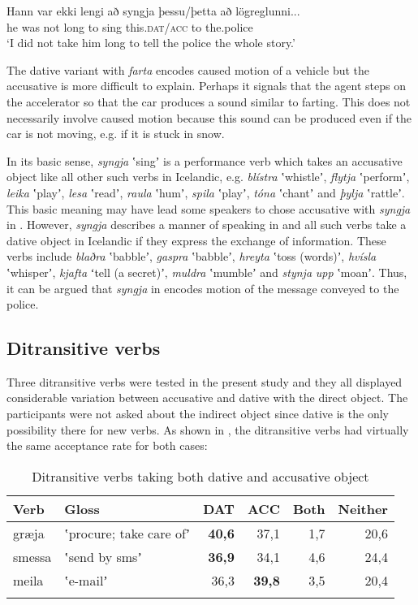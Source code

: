\documentclass[output=paper,modfonts,nonflat,colorlinks,citecolor=brown]{langsci/langscibook}
\begin{document}
\ex  \label{ex:jonsson:8b}
\gll   Hann  var  ekki  lengi  að  syngja  þessu/þetta  að  lögreglunni...  \\
 he  was  not  long  to  sing  this.\textsc{dat/acc}  to  the.police  \\
\glt `I did not take him long to tell the police the whole story.'
\z
\z

The dative variant with \textit{farta} encodes caused motion of a vehicle but the accusative is more difficult to explain. Perhaps it signals that the agent steps on the accelerator so that the car produces a sound similar to farting. This does not necessarily involve caused motion because this sound can be produced even if the car is not moving, e.g. if it is stuck in snow. 

In its basic sense, \textit{syngja} ʽsingʼ is a performance verb which takes an accusative object like all other such verbs in Icelandic, e.g. \textit{blístra} ʽwhistleʼ, \textit{flytja} ʽperformʼ, \textit{leika} ʽplayʼ, \textit{lesa} ʽreadʼ, \textit{raula} ʽhumʼ, \textit{spila} ʽplayʼ, \textit{tóna} ʽchantʼ and \textit{þylja} ʽrattleʼ. This basic meaning may have lead some speakers to chose accusative with \textit{syngja} in . However, \textit{syngja} describes a manner of speaking in  and all such verbs take a dative object in Icelandic if they express the exchange of information. These verbs include \textit{blaðra} ʽbabbleʼ,  \textit{gaspra} ʽbabbleʼ, \textit{hreyta} ʽtoss (words)ʼ, \textit{hvísla} ʽwhisperʼ, \textit{kjafta} ʻtell (a secret)ʼ, \textit{muldra} ʽmumbleʼ and \textit{stynja} \textit{upp} ʽmoanʼ. Thus, it can be argued that \textit{syngja} in  encodes motion of the message conveyed to the police. 

\subsection{Ditransitive verbs} %

Three ditransitive verbs were tested in the present study and they all displayed considerable variation between accusative and dative with the direct object. The participants were not asked about the indirect object since dative is the only possibility there for new verbs. As shown in , the ditransitive verbs had virtually the same acceptance rate for both cases:

\begin{table}
{\caption{\label{tab:jonsson:5}Ditransitive verbs taking both dative and accusative object}}
\begin{tabularx}{\textwidth}{XXrrrr}
\lsptoprule
Verb & Gloss & DAT & ACC & Both & Neither\\
\midrule
græja & ʽprocure; take care ofʼ & \textbf{40,6} & 37,1 & 1,7 & 20,6\\
smessa & ʽsend by smsʼ & \textbf{36,9} & 34,1 & 4,6 & 24,4\\
meila & ʽe-mailʼ & 36,3 & \textbf{39,8} & 3,5 & 20,4\\
\lspbottomrule
\end{tabularx}
\end{table}
\end{document}
